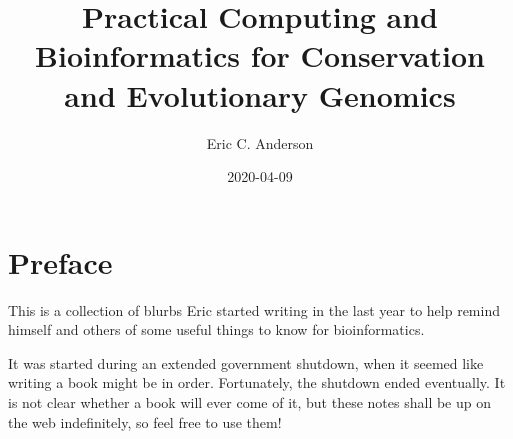 \documentclass[]{krantz}
\title{Practical Computing and Bioinformatics for Conservation and Evolutionary Genomics}
\author{Eric C. Anderson}
\date{2020-04-09}
\begin{document}
\maketitle


\thispagestyle{empty}

\begin{center}

\end{center}

\setlength{\abovedisplayskip}{-5pt}
\setlength{\abovedisplayshortskip}{-5pt}

{
\hypersetup{linkcolor=}
\setcounter{tocdepth}{2}
\tableofcontents
}
\listoftables
\listoffigures
\newcommand{\bitsfa}{{\circ}{\circ}{\circ}{\bullet}}
\newcommand{\bitsfb}{{\circ}{\circ}{\bullet}{\circ}}
\newcommand{\bitsfc}{{\circ}{\bullet}{\circ}{\circ}}
\newcommand{\bitsfd}{{\bullet}{\circ}{\circ}{\circ}}
\newcommand{\bitsopen}{{\circ}{\circ}{\circ}{\circ}}

\newcommand{\bitsa}{\bitsopen~\bitsopen~\bitsfa}
\newcommand{\bitsb}{\bitsopen~\bitsopen~\bitsfb}
\newcommand{\bitsc}{\bitsopen~\bitsopen~\bitsfc}
\newcommand{\bitsd}{\bitsopen~\bitsopen~\bitsfd}

\newcommand{\bitse}{\bitsopen~\bitsfa~\bitsopen}
\newcommand{\bitsf}{\bitsopen~\bitsfb~\bitsopen}
\newcommand{\bitsg}{\bitsopen~\bitsfc~\bitsopen}
\newcommand{\bitsh}{\bitsopen~\bitsfd~\bitsopen}

\newcommand{\bitsi}{\bitsfa~\bitsopen~\bitsopen}
\newcommand{\bitsj}{\bitsfb~\bitsopen~\bitsopen}
\newcommand{\bitsk}{\bitsfc~\bitsopen~\bitsopen}
\newcommand{\bitsl}{\bitsfd~\bitsopen~\bitsopen}
\newcommand{\bitsmany}{\bitsopen~{\circ}{\bullet}{\circ}{\bullet}~{\circ}{\circ}{\bullet}{\bullet}}

\hypertarget{preface}{%
\chapter*{Preface}\label{preface}}


This is a collection of blurbs Eric started writing in the last year to
help remind himself and others of some useful things to know for bioinformatics.

It was started during an extended government shutdown, when it seemed like writing a book
might be in order. Fortunately, the shutdown ended eventually. It is not clear whether a
book will ever come of it, but these notes shall be up on the web indefinitely, so feel free to use
them!
\end{document}

